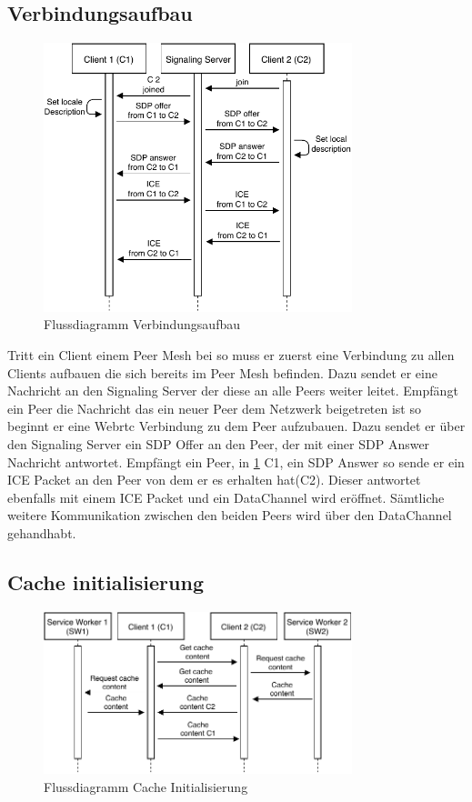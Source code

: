 \begin{description}
\subsection{Verbindungsaufbau}
\begin{figure}[!h]
	\centering
	\includegraphics[width=0.8\textwidth]{figures/verbindungsaufbau}
	\caption[A Figure Short-Title]{Flussdiagramm Verbindungsaufbau}
	\label{fig:verbindungsaufbau}
\end{figure}


Tritt ein Client einem Peer Mesh bei so muss er zuerst eine Verbindung zu allen Clients aufbauen die sich bereits im Peer Mesh befinden. Dazu sendet er eine Nachricht an den Signaling Server der diese an alle Peers weiter leitet. Empfängt ein Peer die Nachricht das ein neuer Peer dem Netzwerk beigetreten ist so beginnt er eine Webrtc Verbindung zu dem Peer aufzubauen. Dazu sendet er über den Signaling Server ein SDP Offer an den Peer, der mit einer SDP Answer Nachricht antwortet. Empfängt ein Peer, in \ref{fig:verbindungsaufbau} C1, ein SDP Answer so sende er ein ICE Packet an den Peer von dem er es erhalten hat(C2). Dieser antwortet ebenfalls mit einem ICE Packet und ein DataChannel wird eröffnet. Sämtliche weitere Kommunikation zwischen den beiden Peers wird über den DataChannel gehandhabt. 

\subsection{Cache initialisierung}
\begin{figure}[!h]
	\centering
	\includegraphics[width=0.8\textwidth]{figures/cache_initialisierung}
	\caption[A Figure Short-Title]{Flussdiagramm Cache Initialisierung}
	\label{fig:cache_initialisierung}
\end{figure}


\end{description}
